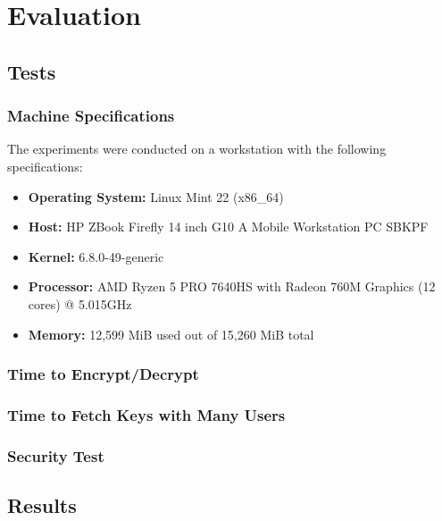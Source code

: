 \documentclass[cic,tc,english]{iiufrgs}
\begin{document}
\chapter{Evaluation}
    \label{chap:evaluation}
    
    \section{Tests}
        \label{sec:tests}

        \subsection{Machine Specifications}
            The experiments were conducted on a workstation with the following specifications:

            \begin{itemize}
                \item \textbf{Operating System:} Linux Mint 22 (x86\_64)
                \item \textbf{Host:} HP ZBook Firefly 14 inch G10 A Mobile Workstation PC SBKPF
                \item \textbf{Kernel:} 6.8.0-49-generic
                \item \textbf{Processor:} AMD Ryzen 5 PRO 7640HS with Radeon 760M Graphics (12 cores) @ 5.015GHz
                \item \textbf{Memory:} 12,599 MiB used out of 15,260 MiB total
            \end{itemize}

        \subsection{Time to Encrypt/Decrypt}
            \label{sec:timeencryptdecrypt}

        \subsection{Time to Fetch Keys with Many Users}
            \label{sec:timefetchkeys}

        \subsection{Security Test}
            \label{sec:securitytest}

    \section{Results}
        \label{sec:results}
\end{document}
